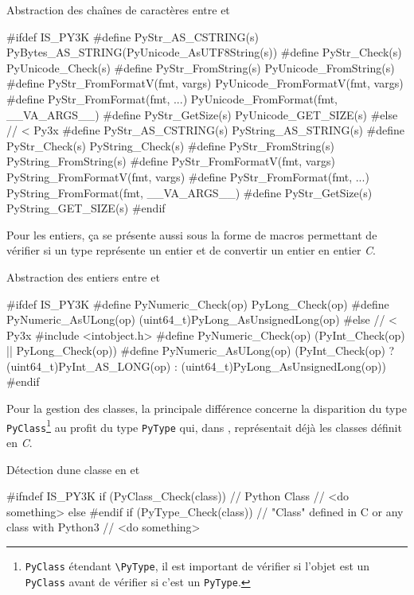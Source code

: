   \begin{listing}[H]
    \caption{Abstraction des chaînes de caractères entre  et }
\begin{ccode}
#ifdef IS_PY3K
#define PyStr_AS_CSTRING(s) PyBytes_AS_STRING(PyUnicode_AsUTF8String(s))
#define PyStr_Check(s) PyUnicode_Check(s)
#define PyStr_FromString(s) PyUnicode_FromString(s)
#define PyStr_FromFormatV(fmt, vargs) PyUnicode_FromFormatV(fmt, vargs)
#define PyStr_FromFormat(fmt, ...) PyUnicode_FromFormat(fmt, __VA_ARGS__)
#define PyStr_GetSize(s) PyUnicode_GET_SIZE(s)
#else // < Py3x
#define PyStr_AS_CSTRING(s) PyString_AS_STRING(s)
#define PyStr_Check(s) PyString_Check(s)
#define PyStr_FromString(s) PyString_FromString(s)
#define PyStr_FromFormatV(fmt, vargs) PyString_FromFormatV(fmt, vargs)
#define PyStr_FromFormat(fmt, ...) PyString_FromFormat(fmt, __VA_ARGS__)
#define PyStr_GetSize(s) PyString_GET_SIZE(s)
#endif
\end{ccode}
  \end{listing}
  
Pour les entiers, ça se présente aussi sous la forme de macros permettant de vérifier si un type \Python représente un entier et de convertir un entier \Python en entier \emph{C}.

  \begin{listing}[H]
    \caption{Abstraction des entiers entre  et }
\begin{ccode}
#ifdef IS_PY3K
#define PyNumeric_Check(op) PyLong_Check(op)
#define PyNumeric_AsULong(op) (uint64_t)PyLong_AsUnsignedLong(op)
#else // < Py3x
#include <intobject.h>
#define PyNumeric_Check(op) (PyInt_Check(op) || PyLong_Check(op))
#define PyNumeric_AsULong(op) (PyInt_Check(op) ? (uint64_t)PyInt_AS_LONG(op) : (uint64_t)PyLong_AsUnsignedLong(op))
#endif
\end{ccode}
  \end{listing} 
  
Pour la gestion des classes, la principale différence concerne la disparition du type \verb|PyClass|\footnote{\verb?PyClass? étendant \verb?\PyType?, il est important de vérifier si l'objet est un \verb?PyClass? avant de vérifier si c'est un \verb?PyType?.} au profit du type \verb|PyType| qui, dans , représentait déjà les classes définit en \emph{C}.

  \begin{listing}[H]
    \caption{Détection dune classe en  et }
\begin{ccode}
#ifndef IS_PY3K
if (PyClass_Check(class)) {
	// Python Class
	// <do something>
} else
#endif
if (PyType_Check(class)) {
	// "Class" defined in C or any class with Python3
	// <do something>
}
\end{ccode}
  \end{listing}
  
